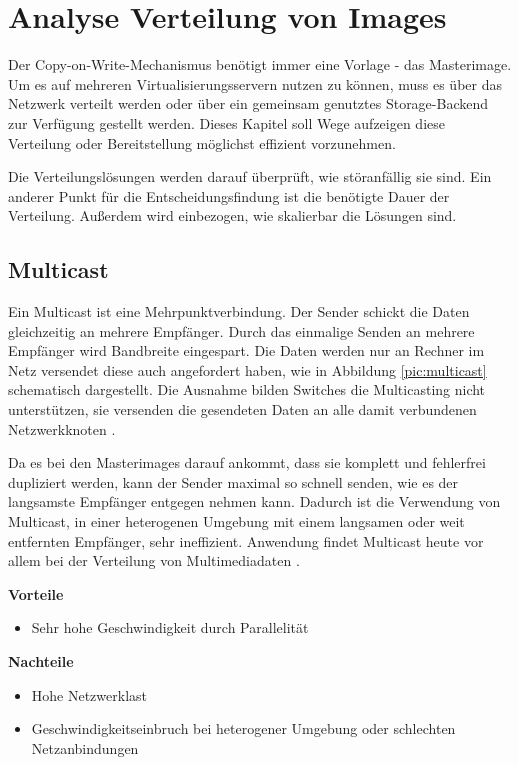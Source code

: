 \chapter{Analyse Verteilung von Images}\label{verteilung}
Der Copy-on-Write-Mechanismus benötigt immer eine Vorlage - das Masterimage. Um es auf mehreren Virtualisierungsservern nutzen zu können, muss es über das Netzwerk verteilt werden oder über ein gemeinsam genutztes Storage-Backend zur Verfügung gestellt werden. Dieses Kapitel soll Wege aufzeigen diese Verteilung oder Bereitstellung möglichst effizient vorzunehmen.

Die Verteilungslösungen werden darauf überprüft, wie störanfällig sie sind. Ein anderer Punkt für die Entscheidungsfindung ist die benötigte Dauer der Verteilung. Außerdem wird einbezogen, wie skalierbar die Lösungen sind.

\section{Multicast}
Ein Multicast ist eine Mehrpunktverbindung. Der Sender schickt die Daten gleichzeitig an mehrere Empfänger. Durch das einmalige Senden an mehrere Empfänger wird Bandbreite eingespart. Die Daten werden nur an Rechner im Netz versendet diese auch angefordert haben, wie in Abbildung \ref{pic:multicast} schematisch dargestellt. Die Ausnahme bilden Switches die Multicasting nicht unterstützen, sie versenden die gesendeten Daten an alle damit verbundenen Netzwerkknoten \cite{multicasttech}. 

Da es bei den Masterimages darauf ankommt, dass sie komplett und fehlerfrei dupliziert werden, kann der Sender maximal so schnell senden, wie es der langsamste Empfänger entgegen nehmen kann.  Dadurch ist die Verwendung von Multicast, in einer heterogenen Umgebung mit einem langsamen oder weit entfernten Empfänger, sehr ineffizient. Anwendung findet Multicast heute vor allem bei der Verteilung von Multimediadaten \cite{multicastfefe}. 


\textbf{Vorteile}
\begin{itemize}
 \item Sehr hohe Geschwindigkeit durch Parallelität
\end{itemize}

\textbf{Nachteile}
\begin{itemize}
 \item Hohe Netzwerklast
 \item Geschwindigkeitseinbruch bei heterogener Umgebung oder schlechten Netzanbindungen
\end{itemize}

